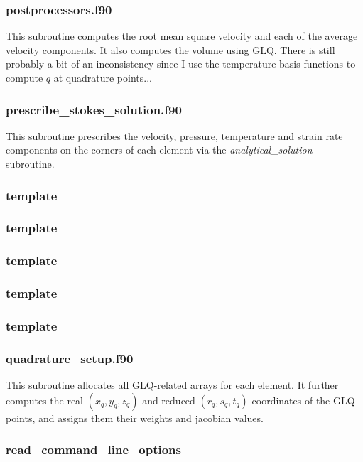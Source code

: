  \subsubsection{postprocessors.f90}
 This subroutine computes the root mean square velocity
 and each of the average velocity components. It also 
 computes the volume using GLQ.
 There is still probably a bit of an inconsistency since I use the 
 temperature basis functions to compute $q$ at quadrature points...
 \subsubsection{prescribe\_stokes\_solution.f90}
 This subroutine prescribes the velocity, pressure, temperature and strain rate components
 on the corners of each element via the {\sl analytical\_solution} subroutine.
 \subsubsection{template}

 \subsubsection{template}

 \subsubsection{template}

 \subsubsection{template}

 \subsubsection{template}

 \subsubsection{quadrature\_setup.f90}
 This subroutine allocates all GLQ-related arrays for each element.
 It further computes the real $(x_q,y_q,z_q)$ and reduced $(r_q,s_q,t_q)$
 coordinates of the GLQ points, and assigns them their weights and
 jacobian values.
 \subsubsection{read\_command\_line\_options}

